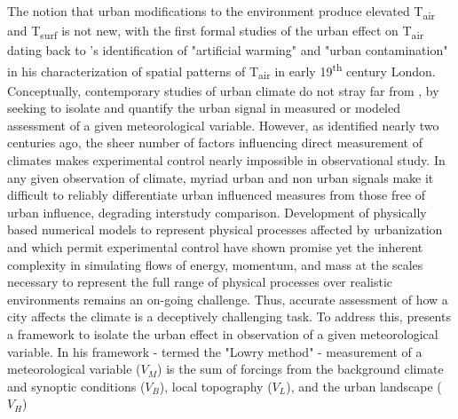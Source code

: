 \begin{bibunit}



The notion that urban modifications to the environment produce elevated T\textsubscript{air} and T\textsubscript{surf} is not new, with the first formal studies of the urban effect on T\textsubscript{air} dating back to \citet{Howard1833}'s identification of "artificial warming" and "urban contamination" in his characterization of spatial patterns of T\textsubscript{air} in early 19\textsuperscript{th} century London. Conceptually, contemporary studies of urban climate do not stray far from \citet{Howard1833}, by seeking to isolate and quantify the urban signal in measured or modeled assessment of a given meteorological variable. However, as \citet{Howard1833} identified nearly two centuries ago, the sheer number of factors influencing direct measurement of climates makes experimental control nearly impossible in observational study. In any given observation of climate, myriad urban and non urban signals make it difficult to reliably differentiate urban influenced measures from those free of urban influence, degrading interstudy comparison. Development of physically based numerical models to represent physical processes affected by urbanization and which permit experimental control have shown promise \citep{Krayenhoff2014,Gastellu-Etchegorry1996,Masson2000,Martilli2002} yet the inherent complexity in simulating flows of energy, momentum, and mass at the scales necessary to represent the full range of physical processes over realistic environments remains an on-going challenge. Thus, accurate assessment of how a city affects the climate is a deceptively challenging task. To address this, \citet{Lowry1977} presents a framework to isolate the urban effect in observation of a given meteorological variable. In his framework - termed the "Lowry method" - measurement of a meteorological variable ($V_M$) is the sum of forcings from the background climate and synoptic conditions ($V_B$), local topography ($V_L$), and the urban landscape ($V_H$)


\end{bibunit}
